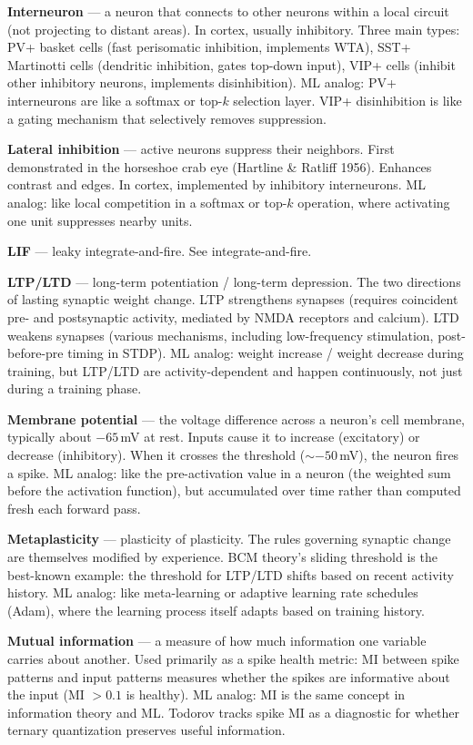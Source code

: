 \documentclass[11pt,a4paper]{article}
\begin{document}
\textbf{Interneuron} --- a neuron that connects to other neurons within a local circuit (not projecting to distant areas). In cortex, usually inhibitory. Three main types: PV+ basket cells (fast perisomatic inhibition, implements WTA), SST+ Martinotti cells (dendritic inhibition, gates top-down input), VIP+ cells (inhibit other inhibitory neurons, implements disinhibition). ML analog: PV+ interneurons are like a softmax or top-$k$ selection layer. VIP+ disinhibition is like a gating mechanism that selectively removes suppression.

\textbf{Lateral inhibition} --- active neurons suppress their neighbors. First demonstrated in the horseshoe crab eye (Hartline \& Ratliff 1956). Enhances contrast and edges. In cortex, implemented by inhibitory interneurons. ML analog: like local competition in a softmax or top-$k$ operation, where activating one unit suppresses nearby units.

\textbf{LIF} --- leaky integrate-and-fire. See integrate-and-fire.

\textbf{LTP/LTD} --- long-term potentiation / long-term depression. The two directions of lasting synaptic weight change. LTP strengthens synapses (requires coincident pre- and postsynaptic activity, mediated by NMDA receptors and calcium). LTD weakens synapses (various mechanisms, including low-frequency stimulation, post-before-pre timing in STDP). ML analog: weight increase / weight decrease during training, but LTP/LTD are activity-dependent and happen continuously, not just during a training phase.

\textbf{Membrane potential} --- the voltage difference across a neuron's cell membrane, typically about $-65$\,mV at rest. Inputs cause it to increase (excitatory) or decrease (inhibitory). When it crosses the threshold (${\sim}{-50}$\,mV), the neuron fires a spike. ML analog: like the pre-activation value in a neuron (the weighted sum before the activation function), but accumulated over time rather than computed fresh each forward pass.

\textbf{Metaplasticity} --- plasticity of plasticity. The rules governing synaptic change are themselves modified by experience. BCM theory's sliding threshold is the best-known example: the threshold for LTP/LTD shifts based on recent activity history. ML analog: like meta-learning or adaptive learning rate schedules (Adam), where the learning process itself adapts based on training history.

\textbf{Mutual information} --- a measure of how much information one variable carries about another. Used primarily as a spike health metric: MI between spike patterns and input patterns measures whether the spikes are informative about the input (MI $> 0.1$ is healthy). ML analog: MI is the same concept in information theory and ML. Todorov tracks spike MI as a diagnostic for whether ternary quantization preserves useful information.
\end{document}
